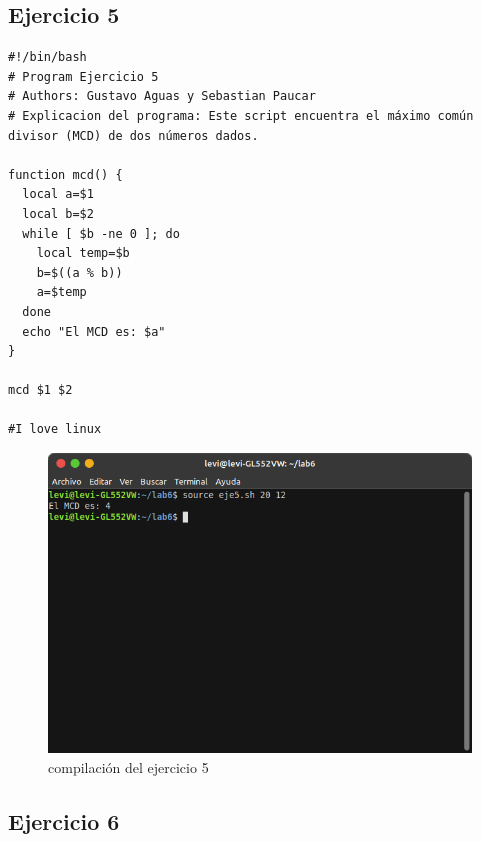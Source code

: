 \documentclass[11pt,twoside]{book}
\begin{document}
\subsection{Ejercicio 5}
\begin{lstlisting}
#!/bin/bash
# Program Ejercicio 5
# Authors: Gustavo Aguas y Sebastian Paucar
# Explicacion del programa: Este script encuentra el máximo común divisor (MCD) de dos números dados.

function mcd() {
  local a=$1
  local b=$2
  while [ $b -ne 0 ]; do
    local temp=$b
    b=$((a % b))
    a=$temp
  done
  echo "El MCD es: $a"
}

mcd $1 $2

#I love linux
\end{lstlisting}
\begin{figure}[h]
    \centering
    \includegraphics[width=0.8\linewidth]{img_tarea6/eje5con.png}
    \caption{ compilación del ejercicio 5}
\end{figure}
\newpage
\subsection{Ejercicio 6}
\end{document}
